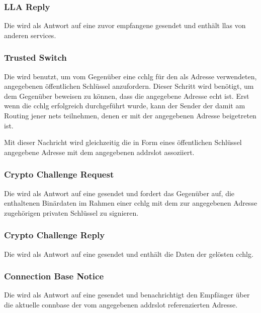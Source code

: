 \isprotollareqbytefield


\subsubsection{LLA Reply}
\label{dcl-isproto-llarep}
Die \msg{\isprotollarep} wird als Antwort auf eine zuvor empfangene \msg{\isprotollareq} gesendet
und enthält \glspl{lla} von anderen \glspl{service}.

\isprotollarepbytefield


\subsubsection{Trusted Switch}
\label{dcl-isproto-ts}
Die \msg{\isprotots} wird benutzt, um vom Gegenüber eine \gls{cchlg} für den als Adresse verwendeten,
angegebenen öffentlichen Schlüssel anzufordern. Dieser Schritt wird benötigt, um dem Gegenüber beweisen
zu können, dass die angegebene Adresse echt ist. Erst wenn die \gls{cchlg} erfolgreich durchgeführt
wurde, kann der Sender der \msg{\isprotots} damit am Routing jener \glspl{net} teilnehmen, denen er
mit der angegebenen Adresse beigetreten ist.

Mit dieser Nachricht wird gleichzeitig die in Form eines öffentlichen Schlüssel angegebene Adresse
mit dem angegebenen \gls{addrslot} assoziiert.

\isprototsbytefield


\subsubsection{Crypto Challenge Request}
\label{dcl-isproto-ccreq}
Die \msg{\isprotoccreq} wird als Antwort auf eine \msg{\isprotots} gesendet und fordert das Gegenüber
auf, die enthaltenen Binärdaten im Rahmen einer \gls{cchlg} mit dem zur angegebenen Adresse
zugehörigen privaten Schlüssel zu signieren.

\isprotoccreqbytefield


\subsubsection{Crypto Challenge Reply}
\label{dcl-isproto-ccrep}
Die \msg{\isprotoccrep} wird als Antwort auf eine \msg{\isprotoccreq} gesendet und enthält die Daten
der gelösten \gls{cchlg}.

\isprotoccrepbytefield


\subsubsection{Connection Base Notice}
\label{dcl-isproto-cbn}
Die \msg{\isprotocbn} wird als Antwort auf eine \msg{\isprotoccrep} gesendet und benachrichtigt
den Empfänger über die aktuelle \gls{connbase} der vom angegebenen \gls{addrslot} referenzierten
Adresse.

